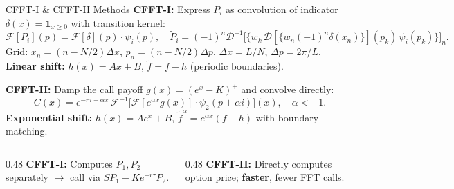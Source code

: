 \documentclass[10pt, aspectratio=169]{beamer}
\begin{document}
\begin{frame}{CFFT-I \& CFFT-II Methods}
\textbf{CFFT-I:} Express $P_i$ as convolution of indicator $\delta(x)=\mathbf{1}_{x\geq 0}$ with transition kernel:
\[
  \mathcal{F}[P_i](p) = \mathcal{F}[\delta](p)\cdot\psi_i(p), \quad
  \widetilde{P}_i = (-1)^n \mathcal{D}^{-1}\!\bigl[\{w_k\,\mathcal{D}[\{w_n(-1)^n\delta(x_n)\}](p_k)\,\psi_i(p_k)\}\bigr]_n.
\]
Grid: $x_n = (n - N/2)\Delta x$, $p_n = (n - N/2)\Delta p$, $\Delta x = L/N$, $\Delta p = 2\pi/L$.
\textbf{Linear shift:} $h(x) = Ax + B$, $\tilde f = f - h$ (periodic boundaries).

\vspace{4pt}
\textbf{CFFT-II:} Damp the call payoff $g(x) = (e^x - K)^+$ and convolve directly:
\[
  C(x) = e^{-r\tau - \alpha x}\,\mathcal{F}^{-1}\!\bigl[\mathcal{F}[e^{\alpha x}g(x)]\cdot\psi_2(p + \alpha i)\bigr](x), \quad \alpha < -1.
\]
\textbf{Exponential shift:} $h(x) = Ae^x + B$, $\tilde{f}^\alpha = e^{\alpha x}(f - h)$ with boundary matching.

\vspace{4pt}
\begin{columns}[T]
\begin{column}{0.48\textwidth}
\textbf{CFFT-I:} Computes $P_1, P_2$ separately $\to$ call via $SP_1 - Ke^{-r\tau}P_2$.
\end{column}
\begin{column}{0.48\textwidth}
\textbf{CFFT-II:} Directly computes option price; \textbf{faster}, fewer FFT calls.
\end{column}
\end{columns}
\end{frame}
\end{document}
